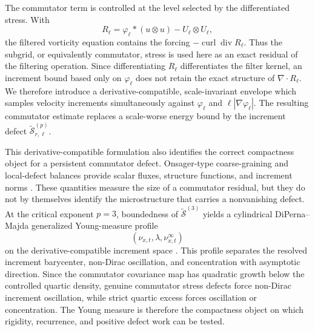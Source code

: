 \documentclass[11pt]{article}
\numberwithin{equation}{section}
\theoremstyle{plain}
\theoremstyle{definition}
\theoremstyle{remark}
\DeclareMathOperator{\curl}{curl}
\DeclareMathOperator{\diver}{div}
\begin{document}
The commutator term is controlled at the level selected by the differentiated stress.  With
\[
R_\ell=\varphi_\ell*(u\otimes u)-U_\ell\otimes U_\ell,
\]
the filtered vorticity equation contains the forcing $-\curl\diver R_\ell$.  Thus the subgrid, or equivalently commutator, stress is used here as an exact residual of the filtering operation.  Since differentiating $R_\ell$ differentiates the filter kernel, an increment bound based only on $\varphi_\ell$ does not retain the exact structure of $\nabla\!\cdot R_\ell$.  We therefore introduce a derivative-compatible, scale-invariant envelope which samples velocity increments simultaneously against $\varphi_\ell$ and $\ell|\nabla\varphi_\ell|$.  The resulting commutator estimate replaces a scale-worse energy bound by the increment defect $\widetilde{\mathcal S}_{r,\ell}^{(p)}$.

This derivative-compatible formulation also identifies the correct compactness object for a persistent commutator defect.  Onsager-type coarse-graining and local-defect balances provide scalar fluxes, structure functions, and increment norms \cite{ConstantinETiti1994,DuchonRobert2000,EyinkAluie2009}.  These quantities measure the size of a commutator residual, but they do not by themselves identify the microstructure that carries a nonvanishing defect.  At the critical exponent $p=3$, boundedness of $\widetilde{\mathcal S}^{(3)}$ yields a cylindrical DiPerna--Majda generalized Young-measure profile
\[
(\nu_{x,t},\lambda,\nu_{x,t}^{\infty})
\]
on the derivative-compatible increment space \cite{DiPernaMajda1987,Ball1989,AlibertBouchitte1997}.  This profile separates the resolved increment barycenter, non-Dirac oscillation, and concentration with asymptotic direction.  Since the commutator covariance map has quadratic growth below the controlled quartic density, genuine commutator stress defects force non-Dirac increment oscillation, while strict quartic excess forces oscillation or concentration.  The Young measure is therefore the compactness object on which rigidity, recurrence, and positive defect work can be tested.
\end{document}
